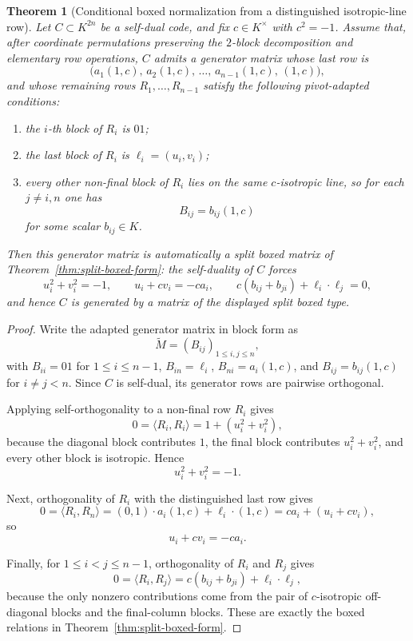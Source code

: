 \documentclass[12pt]{article}
\newtheorem{theorem}{Theorem}[section]
\begin{document}
\begin{theorem}[Conditional boxed normalization from a distinguished isotropic-line row]
\label{thm:conditional-split-boxed-normalization}
Let \(C\subset K^{2n}\) be a self-dual code, and fix \(c\in K^\times\) with \(c^2=-1\). Assume that, after coordinate permutations preserving the \(2\)-block decomposition and elementary row operations, \(C\) admits a generator matrix whose last row is
\[
\bigl(a_1(1,c),\,a_2(1,c),\,\dots,\,a_{n-1}(1,c),\,(1,c)\bigr),
\]
and whose remaining rows \(R_1,\dots,R_{n-1}\) satisfy the following pivot-adapted conditions:
\begin{enumerate}
\item the \(i\)-th block of \(R_i\) is \(01\);
\item the last block of \(R_i\) is \(\ell_i=(u_i,v_i)\);
\item every other non-final block of \(R_i\) lies on the same \(c\)-isotropic line, so for each \(j\neq i,n\) one has
\[
B_{ij}=b_{ij}(1,c)
\]
for some scalar \(b_{ij}\in K\).
\end{enumerate}
Then this generator matrix is automatically a split boxed matrix of Theorem~\ref{thm:split-boxed-form}: the self-duality of \(C\) forces
\[
u_i^2+v_i^2=-1,
\qquad
u_i+c v_i=-c a_i,
\qquad
c(b_{ij}+b_{ji})+\ell_i\cdot \ell_j=0,
\]
and hence \(C\) is generated by a matrix of the displayed split boxed type.
\end{theorem}

\begin{proof}
Write the adapted generator matrix in block form as
\[
\widetilde M=(B_{ij})_{1\le i,j\le n},
\]
with \(B_{ii}=01\) for \(1\le i\le n-1\), \(B_{in}=\ell_i\), \(B_{ni}=a_i(1,c)\), and \(B_{ij}=b_{ij}(1,c)\) for \(i\neq j<n\). Since \(C\) is self-dual, its generator rows are pairwise orthogonal.

Applying self-orthogonality to a non-final row \(R_i\) gives
\[
0=\langle R_i,R_i\rangle
=
1+(u_i^2+v_i^2),
\]
because the diagonal block contributes \(1\), the final block contributes \(u_i^2+v_i^2\), and every other block is isotropic. Hence
\[
u_i^2+v_i^2=-1.
\]

Next, orthogonality of \(R_i\) with the distinguished last row gives
\[
0=\langle R_i,R_n\rangle
=
(0,1)\cdot a_i(1,c)+\ell_i\cdot(1,c)
=
c a_i+(u_i+c v_i),
\]
so
\[
u_i+c v_i=-c a_i.
\]

Finally, for \(1\le i<j\le n-1\), orthogonality of \(R_i\) and \(R_j\) gives
\[
0=\langle R_i,R_j\rangle
=
c(b_{ij}+b_{ji})+\ell_i\cdot\ell_j,
\]
because the only nonzero contributions come from the pair of \(c\)-isotropic off-diagonal blocks and the final-column blocks. These are exactly the boxed relations in Theorem~\ref{thm:split-boxed-form}.
\end{proof}
\end{document}
